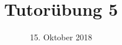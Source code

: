 %
% 
% 
%







\newcommand{\Datum}{\today}

\renewcommand{\PraesentationFusszeileZusatz}{| Tutorium Grundlagen: Datenbanken WS 18/19}

\title{Tutorübung 5}
\author{\PersonVorname{} \PersonNachname}
\institute[]{\UniversitaetName \\ \FakultaetName}
\date[\Datum]{15. Oktober 2018}



\setlength{\baselineskip}{\PraesentationAbstandAbsatz}
\setlength{\parskip}{\baselineskip}

\PraesentationMasterStandard

\PraesentationTitelseite %

